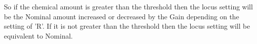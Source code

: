 \documentclass[11pt,twoside,a4paper]{article}
\begin{document}
So if the chemical amount is greater than the threshold then the locus setting will be the Nominal amount increased or decreased by the Gain depending on the setting of 'R'. If it is not greater than the threshold then the locus setting will be equivalent to Nominal.~\\


\end{document}
